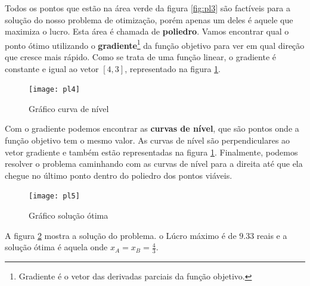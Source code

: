 Todos os pontos que estão na área verde da figura \ref{fig:pl3} são factíveis para a solução do nosso problema de otimização, porém apenas um deles é aquele que maximiza o lucro. Esta área é chamada de \textbf{poliedro}. Vamos encontrar qual o ponto ótimo utilizando o \textbf{gradiente}\footnote{Gradiente é o vetor das derivadas parciais da função objetivo.} da função objetivo para ver em qual direção que cresce mais rápido. Como se trata de uma função linear, o gradiente é constante e igual ao vetor $[4,3]$, representado na figura \ref{fig:pl4}.

\begin{figure}[H]
\begin{centering}
\texttt{[image: pl4]}\protect\caption{\label{fig:pl4}Gráfico curva de nível}
\end{centering}
\end{figure}

Com o gradiente podemos encontrar as \textbf{curvas de nível}, que são pontos onde a função objetivo tem o mesmo valor. As curvas de nível são perpendiculares ao vetor gradiente e também estão representadas na figura \ref{fig:pl4}. Finalmente, podemos resolver o problema caminhando com as curvas de nível para a direita até que ela chegue no último ponto dentro do poliedro dos pontos viáveis. 

\begin{figure}[H]
\begin{centering}
\texttt{[image: pl5]}\protect\caption{\label{fig:pl5}Gráfico solução ótima}
\end{centering}
\end{figure}

A figura \ref{fig:pl5} mostra a solução do problema. o Lúcro máximo é de $9.33$ reais e a solução ótima é aquela onde $x_A=x_B=\frac{4}{3}$.


